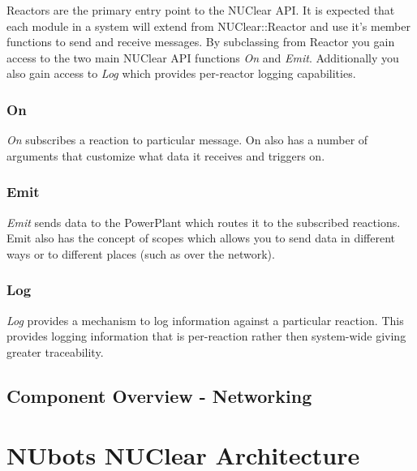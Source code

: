 \documentclass[english,12pt]{scrartcl}
\begin{document}
			Reactors are the primary entry point to the NUClear API. 
			It is expected that each module in a system will extend from NUClear::Reactor and use it's member functions to send and receive messages.
			By subclassing from Reactor you gain access to the two main NUClear API functions \emph{On} and \emph{Emit}. 
			Additionally you also gain access to \emph{Log} which provides per-reactor logging capabilities.
	
			\subsubsection{On}
				\emph{On} subscribes a reaction to particular message. 
				On also has a number of arguments that customize what data it receives and triggers on.
				
			\subsubsection{Emit}
				\emph{Emit} sends data to the PowerPlant which routes it to the subscribed reactions.
				Emit also has the concept of scopes which allows you to send data in different ways or to different places (such as over the network).
	
			\subsubsection{Log}
				\emph{Log} provides a mechanism to log information against a particular reaction. 
				This provides logging information that is per-reaction rather then system-wide giving greater traceability.
	
		\subsection{Component Overview - Networking}
			
	\section{NUbots NUClear Architecture}

	
	
	
	\printglossaries
\end{document}
